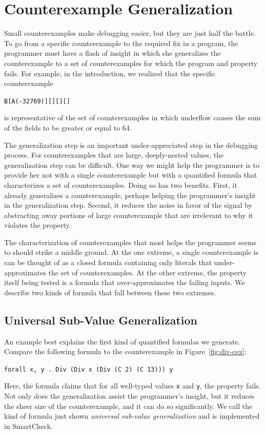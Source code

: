 \documentclass[10pt]{sigplanconf}
\newenvironment{code}{\begin{alltt}}{\end{alltt}}
\newcommand{\ttp}[1]{\texttt{#1}}
\begin{document}
\section{Counterexample Generalization} \label{sec:generalization}

Small counterexamples make debugging easier, but they are just half the battle.
To go from a specific counterexample to the required fix in a program, the
programmer must have a flash of insight in which she generalizes the
counterexample to a set of counterexamples for which the program and property
fails.  For example, in the introduction, we realized that the specific
counterexample
%
\begin{code}
B [A (-32769)] [] [] []
\end{code}
%
\noindent
is representative of the set of counterexamples in which underflow causes the
sum of the fields to be greater or equal to 64.

The generalization step is an important under-appreciated step in the debugging
process.  For counterexamples that are large, deeply-nested values, the
generalization step can be difficult.  One way we might help the programmer is
to provide her not with a single counterexample but with a quantified formula
that characterizes a set of counterexamples.  Doing so has two benefits.  First,
it already generalizes a counterexample, perhaps helping the programmer's
insight in the generalization step.  Second, it reduces the noise in favor of
the signal by abstracting away portions of large counterexample that are
irrelevant to why it violates the property.

The characterization of counterexamples that most helps the programmer seems to
should strike a middle ground.  At the one extreme, a single counterexample is
can be thought of as a closed formula containing only literals that
under-approximates the set of counterexamples.  At the other extreme, the
property itself being tested is a formula that over-approximates the failing
inputs.  We describe two kinds of formula that fall between these two extremes.

\subsection{Universal Sub-Value Generalization}
An example best explains the first kind of quantified formulas we generate.
Compare the following formula to the counterexample in Figure~\ref{fig:div-cex}:
%
\begin{code}
\ttp{forall x, y . Div (Div x (Div (C 2) (C 13))) y}
\end{code}
%
\noindent
Here, the formula claims that for all well-typed values \ttp{x} and \ttp{y}, the
property fails.  Not only does the generalization assist the programmer's
insight, but it reduces the sheer size of the counterexample, and it can do so
significantly.  We call the kind of formula just shown \emph{universal sub-value
  generalization} and is implemented in SmartCheck.
\end{document}
